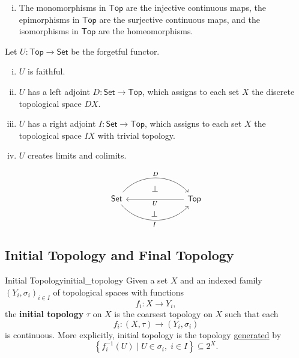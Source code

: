 \documentclass{report}
\begin{document}
\begin{proposition}{}{}
	\begin{enumerate}[(i)]
		\item The monomorphisms in $\mathsf{Top}$ are the injective continuous maps, the epimorphisms in $\mathsf{Top}$ are the surjective continuous maps, and the isomorphisms in $\mathsf{Top}$ are the homeomorphisms.
	\end{enumerate}
\end{proposition}

\begin{proposition}{}{}
	Let $U:\mathsf{Top}\to\mathsf{Set}$ be the forgetful functor.
	\begin{enumerate}[(i)]
		\item $U$ is faithful.
		\item $U$ has a left adjoint $D:\mathsf{Set}\to\mathsf{Top}$, which assigns to each set $X$ the discrete topological space $DX$.
		\item $U$ has a right adjoint $I:\mathsf{Set}\to\mathsf{Top}$, which assigns to each set $X$ the topological space $IX$ with trivial topology.
		\item $U$ creates limits and colimits.
	\end{enumerate}
	\[
		\begin{tikzcd}[ampersand replacement=\&]
			\mathsf{Set}  \arrow[r, "D"{name=A, above}, bend left=49] \arrow[r, "I"'{name=C, below}, bend right=49] \&[+45pt] \mathsf{Top} \arrow[l, "U"'{name=B, below}]
			\arrow[phantom, shorten <=5.5pt, shorten >=5.5pt, from=A.south-|B, to=B, "\bot"']
			\arrow[phantom, shorten <=5.5pt, shorten >=5.5pt, from=B.south-|C, to=C, "\bot"']
		\end{tikzcd}
	\]
\end{proposition}
\subsection{Initial Topology and Final Topology}
\begin{definition}{Initial Topology}{initial_topology}
	Given a set $X$ and an indexed family $\left(Y_i, \sigma_i\right)_{i \in I}$ of topological spaces with functions
	$$
	f_i: X \rightarrow Y_i,
	$$
	the \textbf{initial topology} $\tau$ on $X$ is the coarsest topology on $X$ such that each
	$$
	f_i:(X, \tau) \rightarrow (Y_i, \sigma_i)
	$$
	is continuous. More explicitly, initial topology is the topology \hyperref[th:generated_topology]{generated} by 
	\[
	\left\{ f^{-1}_i(U) \mid U\in \sigma_i, \;i \in I \right\}\subseteq 2^X.
	\]
\end{definition}
\end{document}
